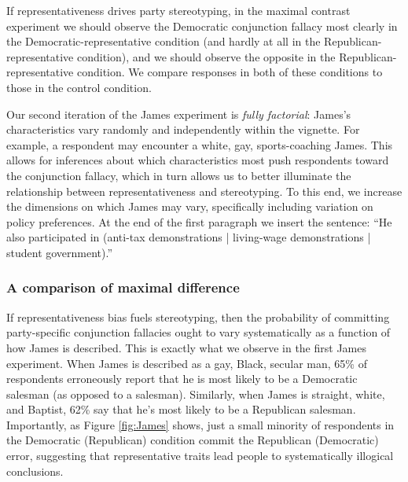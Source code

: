 \documentclass[12pt, letterpaper]{article}
\begin{document}
If representativeness drives party stereotyping, in the maximal contrast experiment we should observe the Democratic conjunction fallacy most clearly in the Democratic-representative condition (and hardly at all in the Republican-representative condition), and we should observe the opposite in the Republican-representative condition. We compare responses in both of these conditions to those in the control condition.

Our second iteration of the James experiment is \emph{fully factorial}: James's characteristics vary randomly and independently within the vignette. For example, a respondent may encounter a white, gay, sports-coaching James. This allows for inferences about which characteristics most push respondents toward the conjunction fallacy, which in turn allows us to better illuminate the relationship between representativeness and stereotyping. To this end, we increase the dimensions on which James may vary, specifically including variation on policy preferences. At the end of the first paragraph we insert the sentence: ``He also participated in (anti-tax demonstrations | living-wage demonstrations | student government).'' %


\subsubsection{A comparison of maximal difference}

If representativeness bias fuels stereotyping, then the probability of committing party-specific conjunction fallacies ought to vary systematically as a function of how James is described. This is exactly what we observe in the first James experiment. When James is described as a gay, Black, secular man, 65\% of respondents erroneously report that he is most likely to be a Democratic salesman (as opposed to a salesman). Similarly, when James is straight, white, and Baptist, 62\% say that he's most likely to be a Republican salesman. Importantly, as Figure \ref{fig:James} shows, just a small minority of respondents in the Democratic (Republican) condition commit the Republican (Democratic) error, suggesting that representative traits lead people to systematically illogical conclusions.
\end{document}
